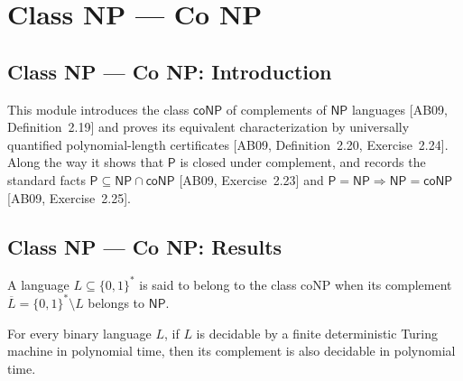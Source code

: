 \section{Class NP --- Co NP}
\subsection*{Class NP --- Co NP: Introduction}

This module introduces the class $\mathsf{coNP}$ of complements of $\mathsf{NP}$
languages [AB09, Definition~2.19] and proves its equivalent characterization by
universally quantified polynomial-length certificates [AB09, Definition~2.20,
Exercise~2.24]. Along the way it shows that $\mathsf{P}$ is closed under complement,
and records the standard facts $\mathsf{P} \subseteq \mathsf{NP} \cap \mathsf{coNP}$
[AB09, Exercise~2.23] and $\mathsf{P} = \mathsf{NP} \Rightarrow \mathsf{NP} =
\mathsf{coNP}$ [AB09, Exercise~2.25].

\subsection*{Class NP --- Co NP: Results}

\begin{definition}
\label{Complexity.coNP}
\leanok
{}
A language $L \subseteq \{0,1\}^{*}$ is said to belong to the class coNP when its
complement $\overline{L} = \{0,1\}^{*} \setminus L$ belongs to $\mathsf{NP}$.
\end{definition}

\begin{theorem}
\label{Complexity.compl_mem_P}
\leanok
{}
For every binary language $L$, if $L$ is decidable by a finite deterministic Turing
machine in polynomial time, then its complement is also decidable in polynomial time.
\end{theorem}


